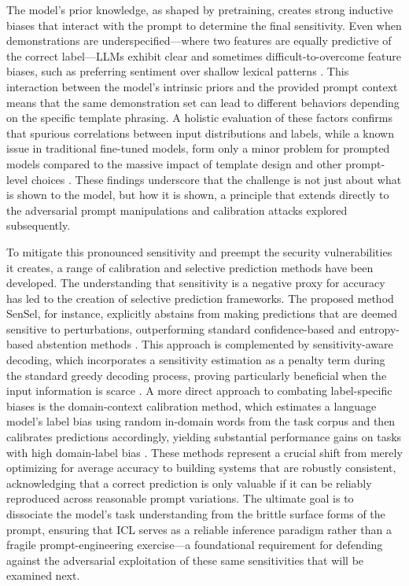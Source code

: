 \documentclass[11pt]{article}
\begin{document}
The model's prior knowledge, as shaped by pretraining, creates strong inductive biases that interact with the prompt to determine the final sensitivity. Even when demonstrations are underspecified---where two features are equally predictive of the correct label---LLMs exhibit clear and sometimes difficult-to-overcome feature biases, such as preferring sentiment over shallow lexical patterns \cite{ref425}. This interaction between the model's intrinsic priors and the provided prompt context means that the same demonstration set can lead to different behaviors depending on the specific template phrasing. A holistic evaluation of these factors confirms that spurious correlations between input distributions and labels, while a known issue in traditional fine-tuned models, form only a minor problem for prompted models compared to the massive impact of template design and other prompt-level choices \cite{ref37}. These findings underscore that the challenge is not just about what is shown to the model, but how it is shown, a principle that extends directly to the adversarial prompt manipulations and calibration attacks explored subsequently.

To mitigate this pronounced sensitivity and preempt the security vulnerabilities it creates, a range of calibration and selective prediction methods have been developed. The understanding that sensitivity is a negative proxy for accuracy has led to the creation of selective prediction frameworks. The proposed method SenSel, for instance, explicitly abstains from making predictions that are deemed sensitive to perturbations, outperforming standard confidence-based and entropy-based abstention methods \cite{ref33}. This approach is complemented by sensitivity-aware decoding, which incorporates a sensitivity estimation as a penalty term during the standard greedy decoding process, proving particularly beneficial when the input information is scarce \cite{ref423}. A more direct approach to combating label-specific biases is the domain-context calibration method, which estimates a language model's label bias using random in-domain words from the task corpus and then calibrates predictions accordingly, yielding substantial performance gains on tasks with high domain-label bias \cite{ref177}. These methods represent a crucial shift from merely optimizing for average accuracy to building systems that are robustly consistent, acknowledging that a correct prediction is only valuable if it can be reliably reproduced across reasonable prompt variations. The ultimate goal is to dissociate the model's task understanding from the brittle surface forms of the prompt, ensuring that ICL serves as a reliable inference paradigm rather than a fragile prompt-engineering exercise---a foundational requirement for defending against the adversarial exploitation of these same sensitivities that will be examined next.
\end{document}
